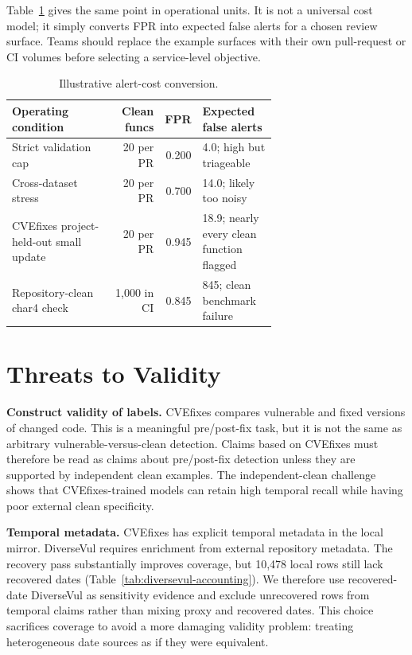 \documentclass[a4paper,fleqn]{cas-dc}
\begin{document}
Table~\ref{tab:alert-cost} gives the same point in operational units. It is not
a universal cost model; it simply converts FPR into expected false alerts for a
chosen review surface. Teams should replace the example surfaces with their own
pull-request or CI volumes before selecting a service-level objective.

\begin{table}
\centering
\caption{Illustrative alert-cost conversion.}
\label{tab:alert-cost}
\small
\setlength{\tabcolsep}{4pt}
\begin{tabular}{p{0.38\linewidth}rrp{0.28\linewidth}}
\toprule
Operating condition & Clean funcs & FPR & Expected false alerts \\
\midrule
Strict validation cap & 20 per PR & 0.200 & 4.0; high but triageable \\
Cross-dataset stress & 20 per PR & 0.700 & 14.0; likely too noisy \\
CVEfixes project-held-out small update & 20 per PR & 0.945 & 18.9; nearly every clean function flagged \\
Repository-clean char4 check & 1,000 in CI & 0.845 & 845; clean benchmark failure \\
\bottomrule
\end{tabular}
\end{table}

\section{Threats to Validity}

\textbf{Construct validity of labels.} CVEfixes compares vulnerable and fixed
versions of changed code. This is a meaningful pre/post-fix task, but it is not
the same as arbitrary vulnerable-versus-clean detection. Claims based on
CVEfixes must therefore be read as claims about pre/post-fix detection unless
they are supported by independent clean examples. The independent-clean
challenge shows that CVEfixes-trained models can retain high temporal recall
while having poor external clean specificity.

\textbf{Temporal metadata.} CVEfixes has explicit temporal metadata in the local
mirror. DiverseVul requires enrichment from external repository metadata. The
recovery pass substantially improves coverage, but 10,478 local rows still lack
recovered dates (Table~\ref{tab:diversevul-accounting}). We therefore use
recovered-date DiverseVul as sensitivity evidence and exclude unrecovered rows
from temporal claims rather than mixing proxy and recovered dates. This choice
sacrifices coverage to avoid a more damaging validity problem: treating
heterogeneous date sources as if they were equivalent.
\end{document}
